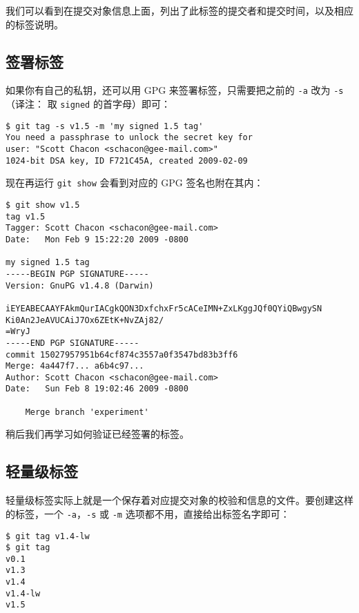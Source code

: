 \documentclass[a4paper]{book}
\begin{document}
我们可以看到在提交对象信息上面，列出了此标签的提交者和提交时间，以及相应的标签说明。

\subsection{签署标签}

如果你有自己的私钥，还可以用 GPG 来签署标签，只需要把之前的 \texttt{-a} 改为 \texttt{-s} （译注： 取 \texttt{signed} 的首字母）即可：

\begin{shaded}\begin{verbatim}
$ git tag -s v1.5 -m 'my signed 1.5 tag'
You need a passphrase to unlock the secret key for
user: "Scott Chacon <schacon@gee-mail.com>"
1024-bit DSA key, ID F721C45A, created 2009-02-09
\end{verbatim}\end{shaded}

现在再运行 \texttt{git show} 会看到对应的 GPG 签名也附在其内：

\begin{shaded}\begin{verbatim}
$ git show v1.5
tag v1.5
Tagger: Scott Chacon <schacon@gee-mail.com>
Date:   Mon Feb 9 15:22:20 2009 -0800

my signed 1.5 tag
-----BEGIN PGP SIGNATURE-----
Version: GnuPG v1.4.8 (Darwin)

iEYEABECAAYFAkmQurIACgkQON3DxfchxFr5cACeIMN+ZxLKggJQf0QYiQBwgySN
Ki0An2JeAVUCAiJ7Ox6ZEtK+NvZAj82/
=WryJ
-----END PGP SIGNATURE-----
commit 15027957951b64cf874c3557a0f3547bd83b3ff6
Merge: 4a447f7... a6b4c97...
Author: Scott Chacon <schacon@gee-mail.com>
Date:   Sun Feb 8 19:02:46 2009 -0800

    Merge branch 'experiment'
\end{verbatim}\end{shaded}

稍后我们再学习如何验证已经签署的标签。

\subsection{轻量级标签}

轻量级标签实际上就是一个保存着对应提交对象的校验和信息的文件。要创建这样的标签，一个 \texttt{-a}，\texttt{-s} 或 \texttt{-m} 选项都不用，直接给出标签名字即可：

\begin{shaded}\begin{verbatim}
$ git tag v1.4-lw
$ git tag
v0.1
v1.3
v1.4
v1.4-lw
v1.5
\end{verbatim}\end{shaded}
\end{document}
